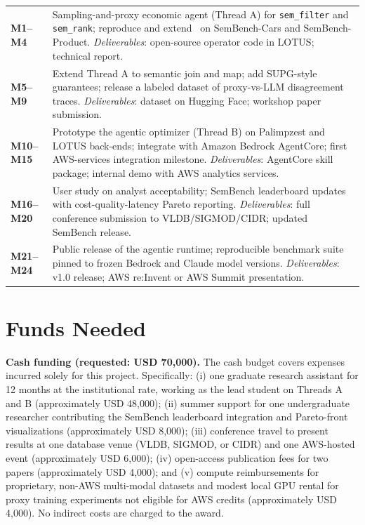\documentclass[11pt]{article}
\begin{document}
\begin{center}
\small
\begin{tabular}{p{2.4cm} p{12.8cm}}
\textbf{M1--M4} & Sampling-and-proxy economic agent (Thread A) for \texttt{sem\_filter} and \texttt{sem\_rank}; reproduce and extend~\cite{chung2026proxy} on SemBench-Cars and SemBench-Product. \emph{Deliverables}: open-source operator code in LOTUS; technical report.\\
\textbf{M5--M9} & Extend Thread A to semantic join and map; add SUPG-style guarantees; release a labeled dataset of proxy-vs-LLM disagreement traces. \emph{Deliverables}: dataset on Hugging Face; workshop paper submission.\\
\textbf{M10--M15} & Prototype the agentic optimizer (Thread B) on Palimpzest and LOTUS back-ends; integrate with Amazon Bedrock AgentCore; first AWS-services integration milestone. \emph{Deliverables}: AgentCore skill package; internal demo with AWS analytics services.\\
\textbf{M16--M20} & User study on analyst acceptability; SemBench leaderboard updates with cost-quality-latency Pareto reporting. \emph{Deliverables}: full conference submission to VLDB/SIGMOD/CIDR; updated SemBench release.\\
\textbf{M21--M24} & Public release of the agentic runtime; reproducible benchmark suite pinned to frozen Bedrock and Claude model versions. \emph{Deliverables}: v1.0 release; AWS re:Invent or AWS Summit presentation.\\
\end{tabular}
\end{center}

\section{Funds Needed}

\noindent\textbf{Cash funding (requested: USD 70{,}000).} The cash budget covers expenses incurred solely for this project. Specifically: (i) one graduate research assistant for 12 months at the institutional rate, working as the lead student on Threads A and B (approximately USD 48{,}000); (ii) summer support for one undergraduate researcher contributing the SemBench leaderboard integration and Pareto-front visualizations (approximately USD 8{,}000); (iii) conference travel to present results at one database venue (VLDB, SIGMOD, or CIDR) and one AWS-hosted event (approximately USD 6{,}000); (iv) open-access publication fees for two papers (approximately USD 4{,}000); and (v) compute reimbursements for proprietary, non-AWS multi-modal datasets and modest local GPU rental for proxy training experiments not eligible for AWS credits (approximately USD 4{,}000). No indirect costs are charged to the award.
\end{document}
